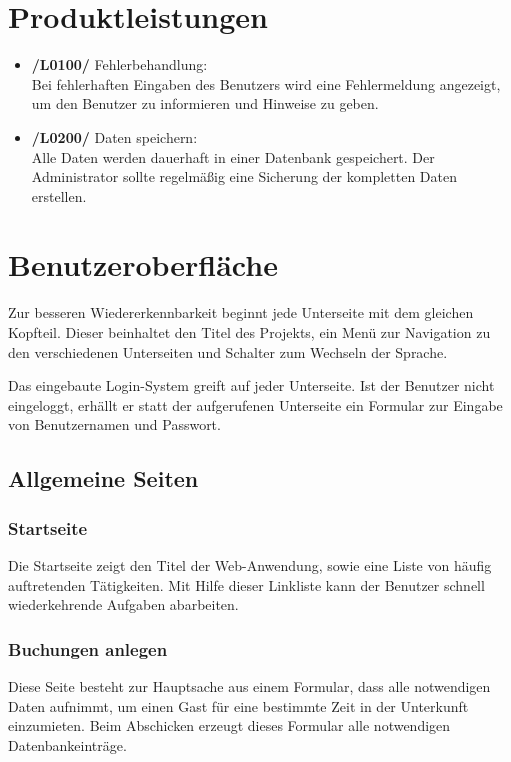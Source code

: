 \documentclass[a4paper,oneside]{scrreprt}
\begin{document}
\chapter{Produktleistungen}

\begin{itemize}
\item \textbf{/L0100/} Fehlerbehandlung: \\
Bei fehlerhaften Eingaben des Benutzers wird eine Fehlermeldung angezeigt, um den Benutzer zu informieren und Hinweise zu geben.

\item \textbf{/L0200/} Daten speichern: \\
Alle Daten werden dauerhaft in einer Datenbank gespeichert. Der Administrator sollte regelmäßig eine Sicherung der kompletten Daten erstellen.
\end{itemize}


\chapter{Benutzeroberfläche}

Zur besseren Wiedererkennbarkeit beginnt jede Unterseite mit dem gleichen Kopfteil. Dieser beinhaltet den Titel des Projekts, ein Menü zur Navigation zu den verschiedenen Unterseiten und Schalter zum Wechseln der Sprache.

Das eingebaute Login-System greift auf jeder Unterseite. Ist der Benutzer nicht eingeloggt, erhällt er statt der aufgerufenen Unterseite ein Formular zur Eingabe von Benutzernamen und Passwort.

\section{Allgemeine Seiten}

\subsection*{Startseite}

Die Startseite zeigt den Titel der Web-Anwendung, sowie eine Liste von häufig auftretenden Tätigkeiten. Mit Hilfe dieser Linkliste kann der Benutzer schnell wiederkehrende Aufgaben abarbeiten.

\subsection*{Buchungen anlegen}

Diese Seite besteht zur Hauptsache aus einem Formular, dass alle notwendigen Daten aufnimmt, um einen Gast für eine bestimmte Zeit in der Unterkunft einzumieten. Beim Abschicken erzeugt dieses Formular alle notwendigen Datenbankeinträge.
\end{document}

